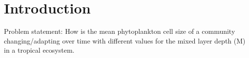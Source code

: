 \section{Introduction}
Problem statement: How is the mean phytoplankton cell size of a community changing/adapting over time with different values for the mixed layer depth (M) in a tropical ecosystem.